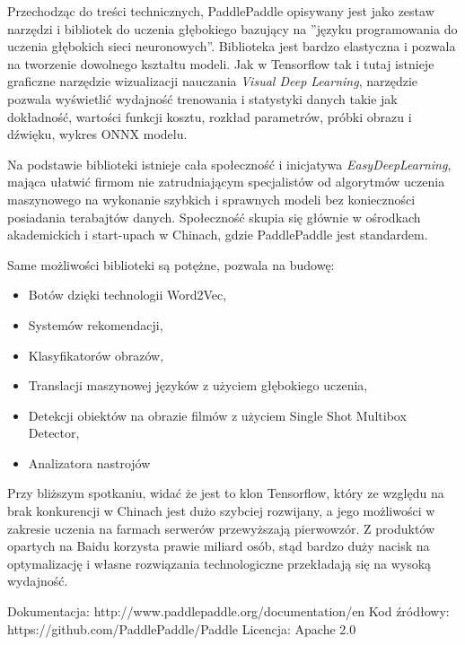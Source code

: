 \documentclass[12pt,a4paper,twoside,titlepage,openright]{book}
\begin{document}
Przechodząc do treści technicznych, PaddlePaddle opisywany jest jako zestaw narzędzi i bibliotek do uczenia głębokiego bazujący na ''języku programowania do uczenia głębokich sieci neuronowych''. Biblioteka jest bardzo elastyczna i pozwala na tworzenie dowolnego kształtu modeli. Jak w Tensorflow tak i tutaj istnieje graficzne narzędzie wizualizacji nauczania \textit{Visual Deep Learning}, narzędzie pozwala wyświetlić wydajność trenowania i statystyki danych takie jak dokładność, wartości funkcji kosztu, rozkład parametrów, próbki obrazu i dźwięku, wykres ONNX modelu.

Na podstawie biblioteki istnieje cała społeczność i inicjatywa \textit{EasyDeepLearning}, mająca ułatwić firmom nie zatrudniającym specjalistów od algorytmów uczenia maszynowego na wykonanie szybkich i sprawnych modeli bez konieczności posiadania terabajtów danych. Społeczność skupia się głównie w ośrodkach akademickich i start-upach w Chinach, gdzie PaddlePaddle jest standardem.

Same możliwości biblioteki są potężne, pozwala na budowę:
\begin{itemize}
\item Botów dzięki technologii Word2Vec,
\item Systemów rekomendacji,
\item Klasyfikatorów obrazów,
\item Translacji maszynowej języków z użyciem głębokiego uczenia,
\item Detekcji obiektów na obrazie filmów z użyciem Single Shot Multibox Detector,
\item Analizatora nastrojów
\end{itemize}

Przy bliższym spotkaniu, widać że jest to klon Tensorflow, który ze względu na brak konkurencji w Chinach jest dużo szybciej rozwijany, a jego możliwości w zakresie uczenia na farmach serwerów przewyższają pierwowzór. Z produktów opartych na Baidu korzysta prawie miliard osób, stąd bardzo duży nacisk na optymalizację i własne rozwiązania technologiczne przekładają się na wysoką wydajność.

\noindent
\newline
Dokumentacja: http://www.paddlepaddle.org/documentation/en
\newline
Kod źródłowy: https://github.com/PaddlePaddle/Paddle
\newline
Licencja: Apache 2.0
\end{document}
